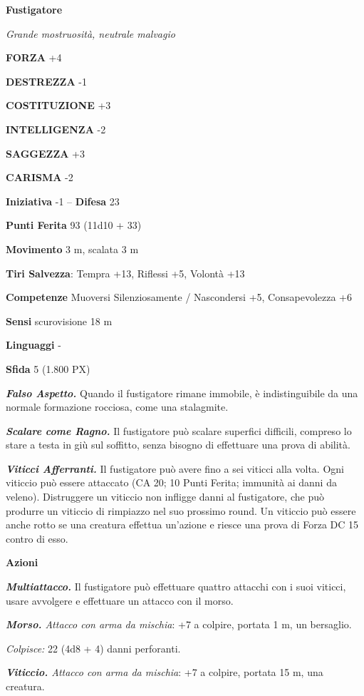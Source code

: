\begin{multicols}{2}
\medskip{}\textbf{Fustigatore}

\textit{Grande mostruosità, neutrale malvagio}

\textbf{FORZA} +4

\textbf{DESTREZZA} -1

\textbf{COSTITUZIONE} +3

\textbf{INTELLIGENZA} -2

\textbf{SAGGEZZA} +3

\textbf{CARISMA} -2

\textbf{Iniziativa} -1 -- \textbf{Difesa} 23

\textbf{Punti Ferita} 93 (11d10 + 33)

\textbf{Movimento} 3 m, scalata 3 m

\textbf{Tiri Salvezza}: Tempra +13, Riflessi +5, Volontà +13

\textbf{Competenze} Muoversi Silenziosamente / Nascondersi +5, Consapevolezza +6

\textbf{Sensi} scurovisione 18 m

\textbf{Linguaggi} -

\textbf{Sfida} 5 (1.800 PX)

\textit{\textbf{Falso Aspetto.}} Quando il fustigatore rimane immobile, è indistinguibile da una normale formazione rocciosa, come una stalagmite.

\textit{\textbf{Scalare come Ragno.}} Il fustigatore può scalare superfici difficili, compreso lo stare a testa in giù sul soffitto, senza bisogno di effettuare una prova di abilità.

\textit{\textbf{Viticci Afferranti.}} Il fustigatore può avere fino a sei viticci alla volta. Ogni viticcio può essere attaccato (CA 20; 10 Punti Ferita; immunità ai danni da veleno). Distruggere un viticcio non infligge danni al fustigatore, che può produrre un viticcio di rimpiazzo nel suo prossimo round. Un viticcio può essere anche rotto se una creatura effettua un'azione e riesce una prova di Forza DC 15 contro di esso.

\textbf{Azioni}

\textit{\textbf{Multiattacco.}} Il fustigatore può effettuare quattro attacchi con i suoi viticci, usare avvolgere e effettuare un attacco con il morso.

\textit{\textbf{Morso.} Attacco con arma da mischia}: +7 a colpire, portata 1 m, un bersaglio.

\textit{Colpisce:} 22 (4d8 + 4) danni perforanti.

\textit{\textbf{Viticcio.} Attacco con arma da mischia}: +7 a colpire, portata 15 m, una creatura.


\end{multicols}
